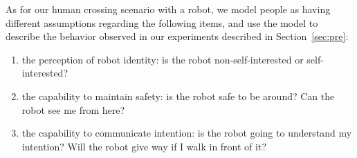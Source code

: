 \documentclass[conference]{IEEEtran}
\begin{document}


As for our human crossing scenario with a robot, we 
model people as having different assumptions regarding the following items, and use the model 
to describe the behavior observed in our experiments described in Section~\ref{sec:pre}:
\begin{enumerate}
  \item the perception of robot identity: is the robot non-self-interested or self-interested?
  \item the capability to maintain safety: is the robot safe to be around? Can 
    the robot see me from here?
  \item the capability to communicate intention: is the robot going to 
    understand my intention? Will the robot give way if I walk in front of it?
\end{enumerate}

\end{document}
